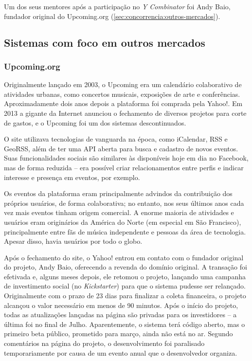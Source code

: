 \documentclass[12pt,a4paper,twoside,hyphens,english,brazil]{abntex2}
\begin{document}
Um dos seus mentores após a participação no \emph{Y Combinator} foi Andy Baio, fundador original do Upcoming.org (\autoref{sec:concorrencia:outros-mercados}).

\subsection{Sistemas com foco em outros mercados} \label{sec:concorrencia:outros-mercados}


\subsubsection*{Upcoming.org}
Originalmente lançado em 2003, o Upcoming era um calendário colaborativo de atividades urbanas, como concertos musicais, exposições de arte e conferências.\cite{upcoming-tnw} Aproximadamente dois anos depois a plataforma foi comprada pela Yahoo!. Em 2013 a gigante da Internet anunciou o fechamento de diversos projetos para corte de gastos, e o Upcoming foi um dos sistemas descontinuados.\cite{upcoming-fechado}

O site utilizava tecnologias de vanguarda na época, como iCalendar, RSS e GeoRSS, além de ter uma API aberta para busca e cadastro de novos eventos. Suas funcionalidades sociais são similares às disponíveis hoje em dia no Facebook, mas de forma reduzida -- era possível criar relacionamentos entre perfis e indicar interesse e presença em eventos, por exemplo.

Os eventos da plataforma eram principalmente advindos da contribuição dos próprios usuários, de forma colaborativa; no entanto, nos seus últimos anos cada vez mais eventos tinham origem comercial. A enorme maioria de atividades e usuários eram originários da América do Norte (em especial em São Francisco), principalmente entre fãs de música independente e pessoas da área de tecnologia. Apesar disso, havia usuários por todo o globo.\cite{upcoming-wikipedia}

Após o fechamento do site, o Yahoo! entrou em contato com o fundador original do projeto, Andy Baio, oferecendo a revenda do domínio original. A transação foi efetivada e, alguns meses depois, ele retomou o projeto, lançando uma campanha de investimento social (no \emph{Kickstarter}) para que o sistema pudesse ser relançado. Originalmente com o prazo de 23 dias para finalizar a coleta financeira, o projeto alcançou o valor necessário em menos de 90 minutos\cite{upcoming-90-min}. Após o início do projeto, todas as atualizações lançadas na página são privadas para os investidores -- a última foi no final de Julho. Aparentemente, o sistema terá código aberto, mas o primeiro beta público, prometido para março, ainda não está no ar. Segundo comentários na página do projeto, o desenvolvimento foi paralisado temporariamente por causa de um evento anual que o desenvolvedor organiza\cite{upcoming-xoxo}.
\end{document}
